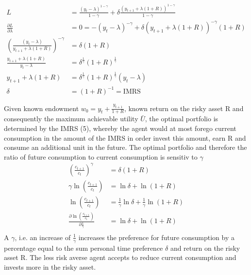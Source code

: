 \documentclass[12pt]{article}
\begin{document}
		\begin{align*}
		L &= \frac{(y_t - \lambda)^{1-\gamma}}{1-\gamma} + \delta \frac{(y_{t+1} + \lambda(1+R))^{1-\gamma}}{1-\gamma}\\
		\frac{\partial L}{\partial \lambda} &= 0 = -(y_t - \lambda)^{-\gamma} + \delta (y_{t+1} + \lambda(1+R))^{-\gamma}(1+R)\\
		\left(\frac{(y_t - \lambda)}{y_{t+1} + \lambda(1+R)}\right)^{-\gamma} &= \delta (1+R)\\
		\frac{y_{t+1} + \lambda(1+R)}{y_t - \lambda} &= \delta^{\frac{1}{\gamma}} (1+R)^\frac{1}{\gamma}\\
		y_{t+1} + \lambda(1+R) &= \delta^{\frac{1}{\gamma}} (1+R)^\frac{1}{\gamma}(y_t - \lambda)\\
		\delta &= (1+R)^{-1} = \text{IMRS}
	\end{align*}
	
	Given known endowment $w_0 = y_t + \frac{y_{t+1}}{1+R}$, known return on the risky asset R and consequently the maximum achievable utility $\bar{U}$, the optimal portfolio is determined by the IMRS (5), whereby the agent would at most forego current consumption in the amount of the IMRS in order invest this amount, earn R and consume an additional unit in the future.  The optimal portfolio and therefore the ratio of future consumption to current consumption is sensitiv to $\gamma$
	\begin{align*}
		\left(\frac{c_{t+1}}{c_t}\right)^\gamma &= \delta (1+R)\\
		\gamma \ln \left(\frac{c_{t+1}}{c_t}\right) &= \ln \delta + \ln (1+R)\\
		\ln \left(\frac{c_{t+1}}{c_t}\right) &= \frac{1}{\gamma} \ln \delta + \frac{1}{\gamma} \ln (1+R)\\
		\frac{\partial \ln \left(\frac{c_{t+1}}{c_t}\right)}{\partial \frac{1}{\gamma}} &= \ln \delta + \ln (1+R)\\
	\end{align*}
	A  $\gamma$, i.e. an increase of $\frac{1}{\gamma}$ increases the preference for future consumption by a percentage equal to the sum personal time preference $\delta$ and return on the risky asset R. The less risk averse agent accepts to reduce current consumption and invests more in the risky asset. 
	
\end{document}
